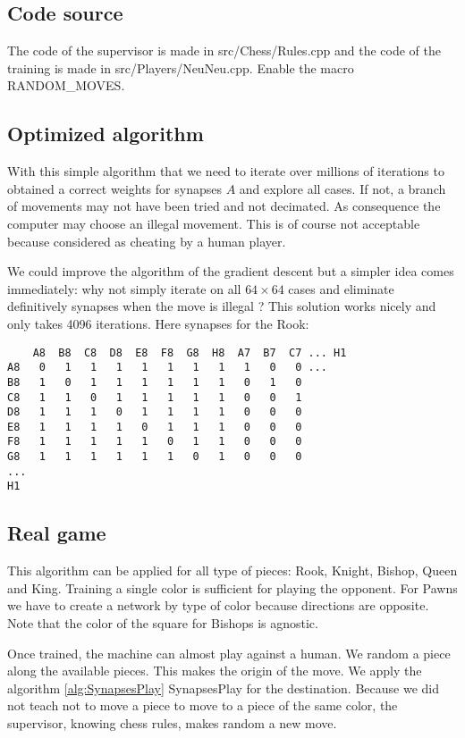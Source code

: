 \documentclass[a4paper,10pt]{article}
\begin{document}
\subsection{Code source}

The code of the supervisor is made in src/Chess/Rules.cpp and the code of the
training is made in src/Players/NeuNeu.cpp. Enable the macro RANDOM\_MOVES.

\subsection{Optimized algorithm}

With this simple algorithm that we need to iterate over millions of iterations
to obtained a correct weights for synapses $A$ and explore all cases. If not, a
branch of movements may not have been tried and not decimated. As consequence
the computer may choose an illegal movement. This is of course not acceptable
because considered as cheating by a human player.

We could improve the algorithm of the gradient descent but a simpler idea comes
immediately: why not simply iterate on all $64 \times 64$ cases and eliminate
definitively synapses when the move is illegal ? This solution works nicely and
only takes 4096 iterations. Here synapses for the Rook:

\begin{verbatim}
    A8  B8  C8  D8  E8  F8  G8  H8  A7  B7  C7 ... H1
A8   0   1   1   1   1   1   1   1   1   0   0 ...
B8   1   0   1   1   1   1   1   1   0   1   0
C8   1   1   0   1   1   1   1   1   0   0   1
D8   1   1   1   0   1   1   1   1   0   0   0
E8   1   1   1   1   0   1   1   1   0   0   0
F8   1   1   1   1   1   0   1   1   0   0   0
G8   1   1   1   1   1   1   0   1   0   0   0
...
H1
\end{verbatim}

\subsection{Real game}

This algorithm can be applied for all type of pieces: Rook, Knight, Bishop,
Queen and King. Training a single color is sufficient for playing the
opponent. For Pawns we have to create a network by type of color because
directions are opposite. Note that the color of the square for Bishops is
agnostic.

Once trained, the machine can almost play against a human. We random a piece
along the available pieces. This makes the origin of the move. We apply the
algorithm \ref{alg:SynapsesPlay} SynapsesPlay for the destination. Because we
did not teach not to move a piece to move to a piece of the same color, the
supervisor, knowing chess rules, makes random a new move.
\end{document}
